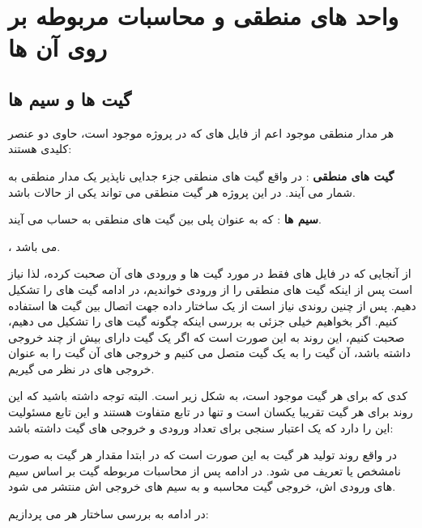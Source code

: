 \section{واحد های منطقی و محاسبات مربوطه بر روی آن ها}

\subsection{گیت ها و سیم ها}
هر مدار منطقی موجود اعم از فایل های 
که در پروژه موجود است، حاوی دو عنصر کلیدی هستند:
\begin{inparaenum}
	\item 
	\textbf{گیت های منطقی}
: در واقع گیت های منطقی جزء جدایی ناپذیر یک مدار منطقی به شمار می آیند. در این پروژه هر گیت منطقی می تواند یکی از حالات 
	باشد. 
	\item
	\textbf{سیم ها}
	: که به عنوان پلی بین گیت های منطقی به حساب می آیند.
\end{inparaenum}
، می باشد.

از آنجایی که در فایل های 
فقط در مورد گیت ها و ورودی های آن صحبت کرده، لذا نیاز است پس از اینکه گیت های منطقی را از ورودی خواندیم، در ادامه گیت های 
را تشکیل دهیم. پس از چنین روندی نیاز است از یک ساختار داده 
جهت اتصال بین گیت ها استفاده کنیم. اگر بخواهیم خیلی جزئی به بررسی اینکه چگونه گیت های 
را تشکیل می دهیم، صحبت کنیم، این روند به این صورت است که اگر یک گیت دارای بیش از چند خروجی داشته باشد، آن گیت را به یک گیت
متصل می کنیم و خروجی های آن گیت را به عنوان خروجی های 
در نظر می گیریم.

کدی که برای هر گیت موجود است، به شکل زیر است. البته توجه داشته باشید که این روند برای هر گیت تقریبا یکسان است و تنها در تابع 
متفاوت هستند و این تابع مسئولیت این را دارد که یک اعتبار سنجی برای تعداد ورودی و خروجی های گیت داشته باشد:
\small {\lr{}}

در واقع روند تولید هر گیت به این صورت است که در ابتدا مقدار هر گیت به صورت نامشخص یا 
تعریف می شود. در ادامه پس از محاسبات مربوطه گیت بر اساس سیم های ورودی اش، خروجی گیت محاسبه و به سیم های خروجی اش منتشر می شود. 

در ادامه به بررسی ساختار هر 
می پردازیم:
\small {\lr{}}

